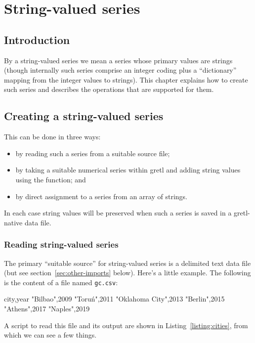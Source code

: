 \chapter{String-valued series}
\label{chap:strval-series}

\section{Introduction}

By a string-valued series we mean a series whose primary values are
strings (though internally such series comprise an integer coding plus
a ``dictionary'' mapping from the integer values to strings). This
chapter explains how to create such series and describes the
operations that are supported for them.

\section{Creating a string-valued series}

This can be done in three ways:
\begin{itemize}
\item by reading such a series from a suitable source file;
\item by taking a suitable numerical series within gretl and adding
  string values using the  function; and
\item by direct assignment to a series from an array of
strings.
\end{itemize}

In each case string values will be preserved when such a series is
saved in a gretl-native data file.

\subsection{Reading string-valued series}
\label{sec:reading}

The primary ``suitable source'' for string-valued series is a
delimited text data file (but see section~\ref{sec:other-imports}
below). Here's a little example. The following is the content of a
file named \texttt{gc.csv}:
%
\begin{code}
city,year
"Bilbao",2009
"Toruń",2011
"Oklahoma City",2013
"Berlin",2015
"Athens",2017
"Naples",2019
\end{code}
%
A script to read this file and its output are shown in
Listing~\ref{listing:cities}, from which we can see a few things.

